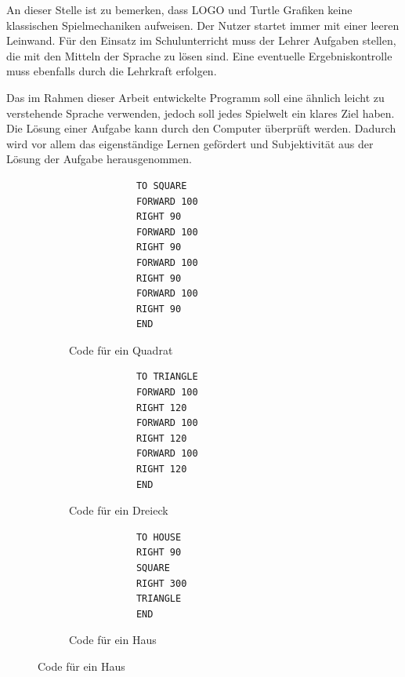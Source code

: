 An dieser Stelle ist zu bemerken, dass LOGO und Turtle Grafiken keine klassischen Spielmechaniken aufweisen. Der Nutzer startet immer mit einer leeren Leinwand. Für den Einsatz im Schulunterricht muss der Lehrer Aufgaben stellen, die mit den Mitteln der Sprache zu lösen sind. Eine eventuelle Ergebniskontrolle muss ebenfalls durch die Lehrkraft erfolgen.

Das im Rahmen dieser Arbeit entwickelte Programm soll eine ähnlich leicht zu verstehende Sprache verwenden, jedoch soll jedes Spielwelt ein klares Ziel haben. Die Lösung einer Aufgabe kann durch den Computer überprüft werden. Dadurch wird vor allem das eigenständige Lernen gefördert und Subjektivität aus der Lösung der Aufgabe herausgenommen.

\begin{figure}
    \begin{subfigure}[b]{0.3\textwidth}
        \begin{lstlisting}
            TO SQUARE
            FORWARD 100
            RIGHT 90
            FORWARD 100
            RIGHT 90
            FORWARD 100
            RIGHT 90
            FORWARD 100
            RIGHT 90
            END
            \end{lstlisting}
        \caption{Code für ein Quadrat}
        \label{fig:related:turtle:square:code}
        \vspace{0.5cm}
    \end{subfigure}\hfill
    \begin{subfigure}[b]{0.3\textwidth}
        \begin{lstlisting}
            TO TRIANGLE
            FORWARD 100
            RIGHT 120
            FORWARD 100
            RIGHT 120
            FORWARD 100
            RIGHT 120
            END
            \end{lstlisting}
        \caption{Code für ein Dreieck}
        \label{fig:related:turtle:triangle:code}
        \vspace{0.5cm}
    \end{subfigure}\hfill
    \begin{subfigure}[b]{0.3\textwidth}
        \begin{lstlisting}
            TO HOUSE
            RIGHT 90
            SQUARE
            RIGHT 300
            TRIANGLE
            END
            \end{lstlisting}
        \caption{Code für ein Haus}
        \label{fig:related:turtle:house:code}
        \vspace{0.5cm}
    \end{subfigure}

\end{figure}
